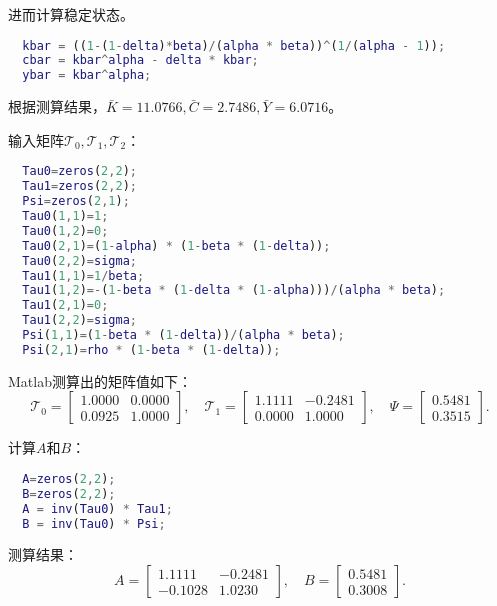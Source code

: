 进而计算稳定状态。
\begin{lstlisting}[language=matlab,frame=single]
  %稳态值
  kbar = ((1-(1-delta)*beta)/(alpha * beta))^(1/(alpha - 1));
  cbar = kbar^alpha - delta * kbar;
  ybar = kbar^alpha;
\end{lstlisting}
根据测算结果，$\bar{K}=11.0766, \bar{C} = 2.7486, \bar{Y} = 6.0716$。

输入矩阵$\mathcal{T}_0, \mathcal{T}_1, \mathcal{T}_2$：
\begin{lstlisting}[language=matlab, frame=single]
  %定义矩阵T0,T1,PSI
  Tau0=zeros(2,2);
  Tau1=zeros(2,2);
  Psi=zeros(2,1);
  Tau0(1,1)=1;
  Tau0(1,2)=0;
  Tau0(2,1)=(1-alpha) * (1-beta * (1-delta));
  Tau0(2,2)=sigma;
  Tau1(1,1)=1/beta;
  Tau1(1,2)=-(1-beta * (1-delta * (1-alpha)))/(alpha * beta);
  Tau1(2,1)=0;
  Tau1(2,2)=sigma;
  Psi(1,1)=(1-beta * (1-delta))/(alpha * beta);
  Psi(2,1)=rho * (1-beta * (1-delta));
\end{lstlisting}
Matlab测算出的矩阵值如下：
\begin{equation*}
  \mathcal{T}_0 = \begin{bmatrix}
  1.0000 &       0.0000 \\
  0.0925 &  1.0000
  \end{bmatrix},\quad
  \mathcal{T}_1=\begin{bmatrix}
  1.1111&   -0.2481 \\
  0.0000&    1.0000
  \end{bmatrix}, \quad
  \Psi = \begin{bmatrix}
  0.5481 \\
  0.3515
  \end{bmatrix}.
\end{equation*}

计算$A$和$B$：
\begin{lstlisting}[language=matlab, frame=single]
  %计算矩阵A,B
  A=zeros(2,2);
  B=zeros(2,2);
  A = inv(Tau0) * Tau1;
  B = inv(Tau0) * Psi;
\end{lstlisting}
测算结果：
\begin{equation*}
  A=\begin{bmatrix}
  1.1111 &  -0.2481 \\
  -0.1028 &   1.0230
\end{bmatrix}, \quad B = \begin{bmatrix}
0.5481 \\
   0.3008
\end{bmatrix}.
\end{equation*}

